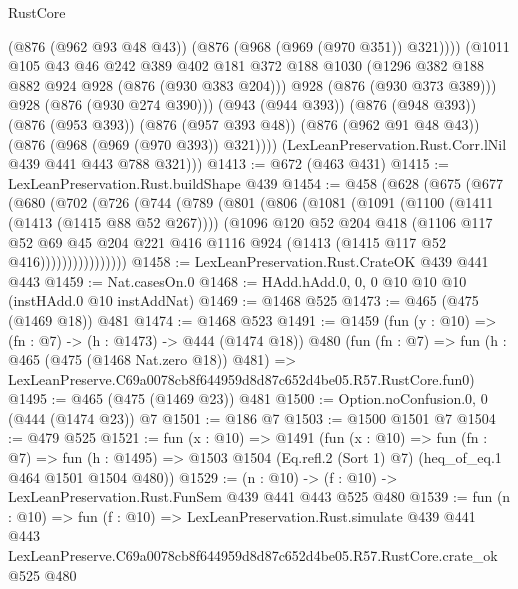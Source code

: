 \begin{lexlean}{RustCore}
\begin{coremodule}
                  (@876 (@962 @93 @48 @43))
                  (@876 (@968 (@969 (@970 @351)) @321))))
              (@1011
                @105
                @43
                @46
                @242
                @389
                @402
                @181
                @372
                @188
                @1030
                (@1296 @382 @188 @882 @924 @928 (@876 (@930 @383 @204)))
                @928
                (@876 (@930 @373 @389)))
              @928
              (@876 (@930 @274 @390)))
            (@943 (@944 @393))
            (@876 (@948 @393))
            (@876 (@953 @393))
            (@876 (@957 @393 @48))
            (@876 (@962 @91 @48 @43))
            (@876 (@968 (@969 (@970 @393)) @321))))
        (LexLeanPreservation.Rust.Corr.lNil @439 @441 @443 @788 @321)))
@1413 := @672 (@463 @431)
@1415 := LexLeanPreservation.Rust.buildShape @439
@1454 := @458
    (@628
      (@675
        (@677
          (@680
            (@702
              (@726
                (@744
                  (@789
                    (@801
                      (@806
                        (@1081
                          (@1091
                            (@1100 (@1411 (@1413 (@1415 @88 @52 @267))))
                            (@1096
                              @120
                              @52
                              @204
                              @418
                              (@1106
                                @117
                                @52
                                @69
                                @45
                                @204
                                @221
                                @416
                                @1116
                                @924
                                (@1413 (@1415 @117 @52 @416))))))))))))))))
@1458 := LexLeanPreservation.Rust.CrateOK @439 @441 @443
@1459 := Nat.casesOn.{0}
@1468 := HAdd.hAdd.{0, 0, 0} @10 @10 @10 (instHAdd.{0} @10 instAddNat)
@1469 := @1468 @525
@1473 := @465 (@475 (@1469 @18)) @481
@1474 := @1468 @523
@1491 := @1459
    (fun (y : @10) => (fn : @7) -> (h : @1473) -> @444 (@1474 @18))
    @480
    (fun (fn : @7) =>
    fun (h : @465 (@475 (@1468 Nat.zero @18)) @481) =>
    LexLeanPreserve.C69a0078cb8f644959d8d87c652d4be05.R57.RustCore.fun0)
@1495 := @465 (@475 (@1469 @23)) @481
@1500 := Option.noConfusion.{0, 0} (@444 (@1474 @23)) @7
@1501 := @186 @7
@1503 := @1500 @1501 @7
@1504 := @479 @525
@1521 := fun (x : @10) =>
  @1491
    (fun (x : @10) =>
    fun (fn : @7) =>
    fun (h : @1495) => @1503 @1504 (Eq.refl.{2} (Sort 1) @7) (heq_of_eq.{1} @464 @1501 @1504 @480))
@1529 := (n : @10) -> (f : @10) -> LexLeanPreservation.Rust.FunSem @439 @441 @443 @525 @480
@1539 := fun (n : @10) =>
  fun (f : @10) =>
  LexLeanPreservation.Rust.simulate
    @439
    @441
    @443
    LexLeanPreserve.C69a0078cb8f644959d8d87c652d4be05.R57.RustCore.crate_ok
    @525
    @480
\end{coremodule}
\end{lexlean}
